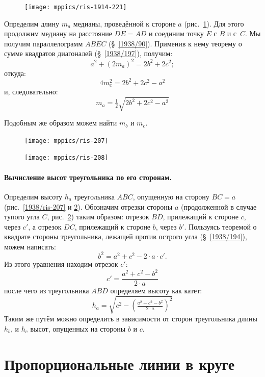 \documentclass[oneside]{book}
\begin{document}
\begin{figure}
\centering
\texttt{[image: mppics/ris-1914-221]}
\caption{}\label{1914/ris-221}
\end{figure}

Определим длину $m_a$ медианы, проведённой к стороне $a$ (рис.~\ref{1914/ris-221}).
Для этого продолжим медиану на расстояние $DE=AD$ и соединим точку $E$ с $B$ и с~$C$.
Мы получим параллелограмм $ABEC$ (§~\ref{1938/90}).
Применив к нему теорему о сумме квадратов диагоналей (§~\ref{1938/197}), получим:
\[a^2+(2m_a)^2=2b^2+2c^2;\]
откуда: 
\[4m_c^2=2b^2+2c^2-a^2\]
и, следовательно:
\[m_a=\tfrac 12\sqrt{2b^2+2c^2-a^2}\]

Подобным же образом можем найти $m_b$ и $m_c$.

\begin{figure}[h!]
\begin{minipage}{.48\textwidth}
\centering
\texttt{[image: mppics/ris-207]}
\caption{}\label{1938/ris-207}
\end{minipage}
\hfill
\begin{minipage}{.48\textwidth}
\centering
\texttt{[image: mppics/ris-208]}
\caption{}\label{1938/ris-208}
\end{minipage}
\end{figure}

\paragraph{Вычисление высот треугольника по его сторонам.}\label{1938/198}
Определим высоту $h_a$ треугольника $ABC$, опущенную на сторону $BC=a$ (рис.~\ref{1938/ris-207} и \ref{1938/ris-208}).
Обозначим отрезки стороны $a$ (продолженной в случае тупого угла $C$, рис.~\ref{1938/ris-208}) таким образом:
отрезок $BD$, прилежащий к стороне $c$, через $c'$, а отрезок $DC$, прилежащий к стороне $b$, через $b'$.
Пользуясь теоремой о квадрате стороны треугольника, лежащей против острого угла (§~\ref{1938/194}), можем написать:
\[b^2=a^2+c^2-2\cdot a\cdot c'.\]
Из этого уравнения находим отрезок $c'$:
\[c'=\frac{a^2+c^2-b^2}{2\cdot a}\]
после чего из треугольника $ABD$ определяем высоту как катет:
\[h_a=\sqrt{c^2-\left(\tfrac{a^2+c^2-b^2}{2\cdot a}\right)^2}\]
Таким же путём можно определить в зависимости от сторон треугольника длины $h_b$, и $h_c$ высот, опущенных на стороны $b$ и $c$.

\section{Пропорциональные линии в круге}
\end{document}
